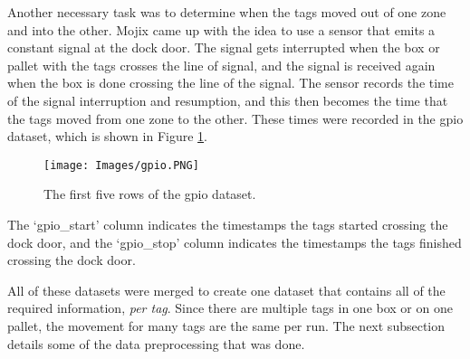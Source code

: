 \documentclass{article}
\begin{document}
Another necessary task was to determine when the tags moved out of one zone and into the other.
Mojix came up with the idea to use a sensor that emits a constant signal at the dock door.
The signal gets interrupted when the box or pallet with the tags crosses the line of signal, and the signal is received again when the box is done crossing the line of the signal.
The sensor records the time of the signal interruption and resumption, and this then becomes the time that the tags moved from one zone to the other.
These times were recorded in the gpio dataset, which is shown in Figure \ref{fig:gpio_data}.
%
\begin{figure}[h]
    \centering
    \texttt{[image: Images/gpio.PNG]}
    \caption{The first five rows of the gpio dataset.}
    \label{fig:gpio_data}
\end{figure}
%
The `gpio\_start' column indicates the timestamps the tags started crossing the dock door, and the `gpio\_stop' column indicates the timestamps the tags finished crossing the dock door.

All of these datasets were merged to create one dataset that contains all of the required information, \emph{per tag}.
Since there are multiple tags in one box or on one pallet, the movement for many tags are the same per run.
The next subsection details some of the data preprocessing that was done.
\end{document}
